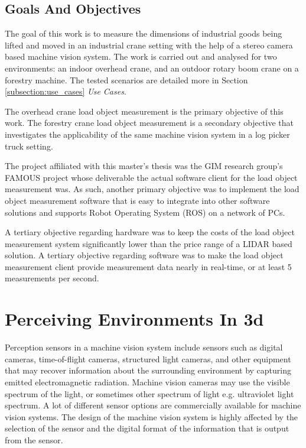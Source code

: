 \documentclass[12pt,a4paper,oneside,pdftex]{report}
\begin{document}
\section{Goals And Objectives}
\label{section:goals_and_objectives}

The goal of this work is to measure the dimensions of industrial goods being lifted and moved in an industrial crane setting with the help of a stereo camera based machine vision system. The work is carried out and analysed for two environments: an indoor overhead crane, and an outdoor rotary boom crane on a forestry machine. The tested scenarios are detailed more in Section \ref{subsection:use_cases} \emph{Use Cases}.

The overhead crane load object measurement is the primary objective of this work. The forestry crane load object measurement is a secondary objective that investigates the applicability of the same machine vision system in a log picker truck setting.

The project affiliated with this master's thesis was the GIM research group's FAMOUS project whose deliverable the actual software client for the load object measurement was. As such, another primary objective was to implement the load object measurement software that is easy to integrate into other software solutions and supports Robot Operating System (ROS) on a network of PCs.

A tertiary objective regarding hardware was to keep the costs of the load object measurement system significantly lower than the price range of a LIDAR based solution. A tertiary objective regarding software was to make the load object measurement client provide measurement data nearly in real-time, or at least 5 measurements per second.

\chapter{Perceiving Environments In 3d}
\label{chapter:perceiving_environments_in_3d}

Perception sensors in a machine vision system include sensors such as digital cameras, time-of-flight cameras, structured light cameras, and other equipment that may recover information about the surrounding environment by capturing emitted electromagnetic radiation. Machine vision cameras may use the visible spectrum of the light, or sometimes other spectrum of light e.g. ultraviolet light spectrum. A lot of different sensor options are commercially available for machine vision systems. The design of the machine vision system is highly affected by the selection of the sensor and the digital format of the information that is output from the sensor.
\end{document}
